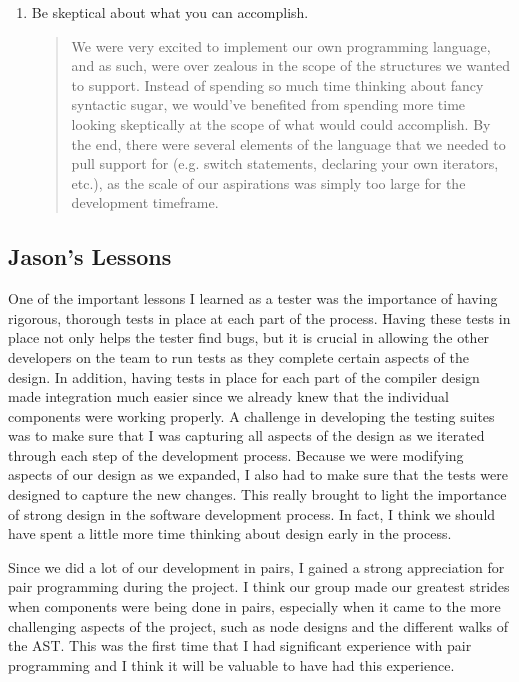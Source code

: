\documentclass{book}
\begin{document}
\begin{enumerate}
\begin{quotation}
\end{quotation}
\item Be skeptical about what you can accomplish.
\begin{quotation}
\noindent We were very excited to implement our own programming language, and as such, were
over zealous in the scope of the structures we wanted to support. Instead of spending so
much time thinking about fancy syntactic sugar, we would've benefited from spending more time
looking skeptically at the scope of what would could accomplish. By the end, there were several elements of the language that we needed to pull support for (e.g. switch statements, declaring your own iterators, etc.), as the scale of our aspirations was simply too large for the 
development timeframe.
\end{quotation}
\end{enumerate}

\subsection{Jason's Lessons}
\label{sub:jasons-lessons}

One of the important lessons I learned as a tester was the importance of having rigorous, thorough tests in place at each part of the process. Having these tests in place not only helps the tester find bugs, but it is crucial in allowing the other developers on the team to run tests as they complete certain aspects of the design. In addition, having tests in place for each part of the compiler design made integration much easier since we already knew that the individual components were working properly. A challenge in developing the testing suites was to make sure that I was capturing all aspects of the design as we iterated through each step of the development process. Because we were modifying aspects of our design as we expanded, I also had to make sure that the tests were designed to capture the new changes.  This really brought to light the importance of strong design in the software development process. In fact, I think we should have spent a little more time thinking about design early in the process.

Since we did a lot of our development in pairs, I gained a strong appreciation for pair programming during the project. I think our group made our greatest strides when components were being done in pairs, especially when it came to the more challenging aspects of the project, such as node designs and the different walks of the AST. This was the first time that I had significant experience with pair programming and I think it will be valuable to have had this experience.
\end{document}
